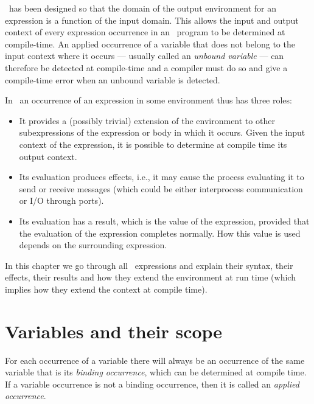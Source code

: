 \Erlang\ has been designed so that the domain of the output
environment for an expression is a function of the input domain.  This
allows the input and output context of every expression occurrence in
an \Erlang\ program to be determined at compile-time.  An applied occurrence
of a variable that does not belong to the input context where it occurs
--- usually called an \emph{unbound variable} ---
can therefore be detected at compile-time and a compiler must do so and give a
compile-time error when an unbound variable is detected.

In \Erlang\ an occurrence of an expression in some environment thus
has three roles:
\begin{itemize}
\item It provides a (possibly trivial) extension of the environment to
other subexpressions of the expression or body in which it occurs.
Given the input context of the expression, it
is possible to determine at compile time its output context.
\item Its evaluation produces effects, i.e., it may cause the
process evaluating it to send or receive messages (which could be
either interprocess communication or I/O through ports).
\item Its evaluation has a result, which is the value of the
expression,
provided that the evaluation of the expression completes normally.
How this value is used depends on the surrounding expression.
\end{itemize}

In this chapter we go through all \Erlang\ expressions and explain
their syntax, their effects, their results and how they extend the
environment at run time (which implies how they extend the context at
compile time).

\section{Variables and their scope}

\label{section:scope}

\ifStd
For each occurrence of a variable there will always be an occurrence
of the same variable that is its \emph{binding
occurrence}, which can be
determined at compile time.  If a variable occurrence is not a binding
occurrence, then it is called an \emph{applied
occurrence}.

